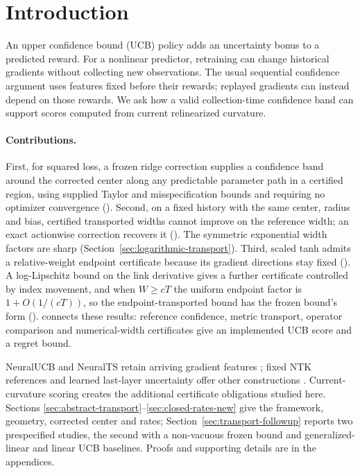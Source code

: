\section{Introduction}\label{sec:intro}

An upper confidence bound (UCB) policy adds an uncertainty bonus to a predicted
reward. For a nonlinear predictor, retraining can change historical gradients
without collecting new observations. The usual sequential confidence argument
uses features fixed before their rewards; replayed gradients can instead
depend on those rewards. We ask how a valid collection-time confidence band
can support scores computed from current relinearized curvature.

\paragraph{Contributions.}
First, for squared loss, a frozen ridge correction supplies a confidence band
around the corrected center along any predictable parameter path in a
certified region, using supplied Taylor and misspecification bounds and
requiring no optimizer convergence ().
Second, on a fixed history with the same center, radius and bias, certified
transported widths cannot improve on the reference width; an exact actionwise
correction recovers it (). The symmetric
exponential width factors are sharp (Section~\ref{sec:logarithmic-transport}).
Third, scaled tanh admits a relative-weight endpoint certificate because its
gradient directions stay fixed ().
A log-Lipschitz bound on the link derivative gives a further certificate
controlled by index movement, and when $W\ge cT$ the uniform endpoint factor
is $1+O(1/(cT))$, so the endpoint-transported bound has the frozen bound's form
().
 connects these results: reference confidence,
metric transport, operator comparison and numerical-width certificates give
an implemented UCB score and a regret bound.

NeuralUCB and NeuralTS retain arriving gradient features
\citep{zhou2020neural,zhang2021neural}; fixed NTK references and learned
last-layer uncertainty offer other constructions
\citep{kassraie2022neural,riquelme2018deep}. Current-curvature scoring creates
the additional certificate obligations studied here. Sections
\ref{sec:abstract-transport}--\ref{sec:closed-rates-new} give the framework,
geometry, corrected center and rates; Section~\ref{sec:transport-followup}
reports two prespecified studies, the second with a non-vacuous frozen bound
and generalized-linear and linear UCB baselines. Proofs and supporting details are in the appendices.
